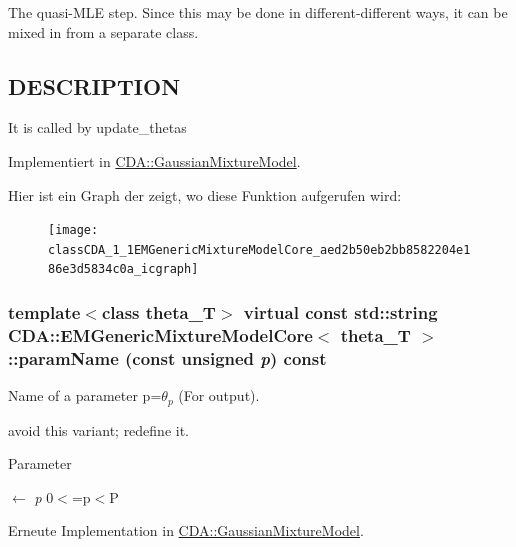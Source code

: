The quasi-\/MLE step. Since this may be done in different-\/different ways, it can be mixed in from a separate class. 

\hypertarget{ProbabilisticClustering_8h_09_09_DESCRIPTION}{}\subsection{DESCRIPTION}\label{ProbabilisticClustering_8h_09_09_DESCRIPTION}
It is called by update\_\-thetas 

Implementiert in \hyperlink{classCDA_1_1GaussianMixtureModel_afe0080d43eb7169d66e57d074f1b7efc}{CDA::GaussianMixtureModel}.



Hier ist ein Graph der zeigt, wo diese Funktion aufgerufen wird:\nopagebreak
\begin{figure}[H]
\begin{center}
\leavevmode
\texttt{[image: classCDA\_1\_1EMGenericMixtureModelCore\_aed2b50eb2bb8582204e186e3d5834c0a\_icgraph]}
\end{center}
\end{figure}


\hypertarget{classCDA_1_1EMGenericMixtureModelCore_a25afd2a5587cc649efe6c953d168198f}{
\subsubsection[{paramName}]{\setlength{\rightskip}{0pt plus 5cm}template$<$class theta\_\-T$>$ virtual const std::string {\bf CDA::EMGenericMixtureModelCore}$<$ theta\_\-T $>$::paramName (const unsigned {\em p}) const}}
\label{classCDA_1_1EMGenericMixtureModelCore_a25afd2a5587cc649efe6c953d168198f}


Name of a parameter p=$\theta_p$ (For output). 

avoid this variant; redefine it.


\begin{DoxyParams}{Parameter}
\item[\mbox{$\leftarrow$} {\em p}]0$<$=p$<$P \end{DoxyParams}


Erneute Implementation in \hyperlink{classCDA_1_1GaussianMixtureModel_ace9d6f0ae0c45734c78be74b2c15d36b}{CDA::GaussianMixtureModel}.



